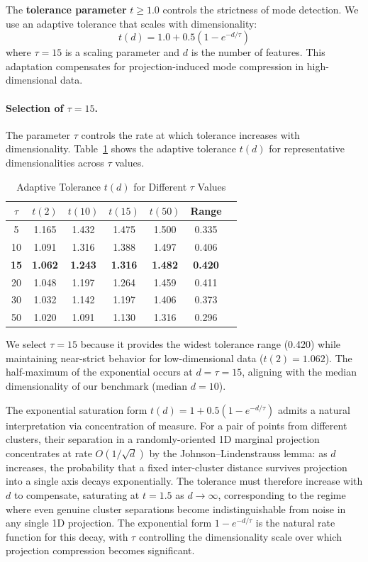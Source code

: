 \documentclass[journal]{IEEEtran}
\begin{document}
The \textbf{tolerance parameter} $t \geq 1.0$ controls the strictness of mode detection. We use an adaptive tolerance that scales with dimensionality:
\begin{equation}
t(d) = 1.0 + 0.5\left(1 - e^{-d / \tau}\right)
\label{eq:tolerance}
\end{equation}
where $\tau = 15$ is a scaling parameter and $d$ is the number of features. This adaptation compensates for projection-induced mode compression in high-dimensional data.

\paragraph{Selection of $\tau = 15$.}
The parameter $\tau$ controls the rate at which tolerance increases with dimensionality. Table~\ref{tab:tolerance} shows the adaptive tolerance $t(d)$ for representative dimensionalities across $\tau$ values.

\begin{table}[t]
\centering
\caption{Adaptive Tolerance $t(d)$ for Different $\tau$ Values}
\label{tab:tolerance}
\begin{tabular}{ccccccc}
\toprule
$\tau$ & $t(2)$ & $t(10)$ & $t(15)$ & $t(50)$ & Range\\
\midrule
5  & 1.165 & 1.432 & 1.475 & 1.500 & 0.335\\
10 & 1.091 & 1.316 & 1.388 & 1.497 & 0.406\\
\textbf{15} & \textbf{1.062} & \textbf{1.243} & \textbf{1.316} & \textbf{1.482} & \textbf{0.420}\\
20 & 1.048 & 1.197 & 1.264 & 1.459 & 0.411\\
30 & 1.032 & 1.142 & 1.197 & 1.406 & 0.373\\
50 & 1.020 & 1.091 & 1.130 & 1.316 & 0.296\\
\bottomrule
\end{tabular}
\end{table}

We select $\tau = 15$ because it provides the widest tolerance range (0.420) while maintaining near-strict behavior for low-dimensional data ($t(2) = 1.062$). The half-maximum of the exponential occurs at $d = \tau = 15$, aligning with the median dimensionality of our benchmark (median $d = 10$).

The exponential saturation form $t(d) = 1 + 0.5(1 - e^{-d/\tau})$ admits a natural interpretation via concentration of measure. For a pair of points from different clusters, their separation in a randomly-oriented 1D marginal projection concentrates at rate $O(1/\sqrt{d})$ by the Johnson--Lindenstrauss lemma: as $d$ increases, the probability that a fixed inter-cluster distance survives projection into a single axis decays exponentially. The tolerance must therefore increase with $d$ to compensate, saturating at $t = 1.5$ as $d \to \infty$, corresponding to the regime where even genuine cluster separations become indistinguishable from noise in any single 1D projection. The exponential form $1 - e^{-d/\tau}$ is the natural rate function for this decay, with $\tau$ controlling the dimensionality scale over which projection compression becomes significant.
\end{document}
